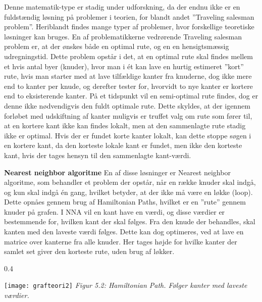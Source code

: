 Denne matematik-type er stadig under udforskning, da der endnu ikke er en fuldstændig løsning på problemer i teorien, for blandt andet ”Traveling salesman problem”. Heriblandt findes mange typer af problemer, hvor forskellige teoretiske løsninger kan bruges. 
En af problematikkerne vedrørende Traveling salesman problem er,
at der ønskes både en optimal rute, og en en hensigtsmæssig udregningstid. Dette problem opstår i det, at en optimal rute skal findes mellem et hvis antal byer (knuder), hvor man i ét kan lave en hurtig estimeret ”kort” rute, hvis man starter med at lave tilfældige kanter fra knuderne, dog ikke mere end to kanter per knude, og derefter tester for, hvorvidt to nye kanter er kortere end to eksisterende kanter. På et tidspunkt vil en semi-optimal rute findes, dog er denne ikke nødvendigvis den fuldt optimale rute. Dette skyldes, at der igennem forløbet med udskiftning af kanter muligvis er truffet valg om rute som fører til, at en kortere kant ikke kan findes lokalt, men at den sammenlagte rute stadig ikke er optimal. Hvis der er fundet korte kanter lokalt, kan dette stoppe søgen i en kortere kant, da den korteste lokale kant er fundet, men ikke den korteste kant, hvis der tages hensyn til den sammenlagte kant-værdi. \citep{TSP} \newline

\textbf{Nearest neighbor algoritme}\newline
En af disse løsninger er Nearest neighbor algoritme, som behandler et problem der opstår, når en række knuder skal indgå, og kun skal indgå én gang, hvilket betyder, at der ikke må være en løkke (loop). Dette opnåes gennem brug af Hamiltonian Paths, hvilket er en ”rute” gennem knuder på grafen. I NNA vil en kant have en værdi, og disse værdier er bestemmende for, hvilken kant der skal følges. Fra den knude der behandles, skal kanten med den laveste værdi følges. Dette kan dog optimeres, ved at lave en matrice over kanterne fra alle knuder. Her tages højde for hvilke kanter der samlet set giver den korteste rute, uden brug af løkker. \citep{NNA}
\newline


\begin{wrapfigure}{}{0.4\textwidth}
	\vspace{-40pt}
	\begin{center}
		\texttt{[image: grafteori2]} \newline
		\textit{ Figur 5.2: Hamiltonian Path. \newline Følger kanter med laveste værdier.}
	\end{center}
	\vspace{-10pt}
\end{wrapfigure}

